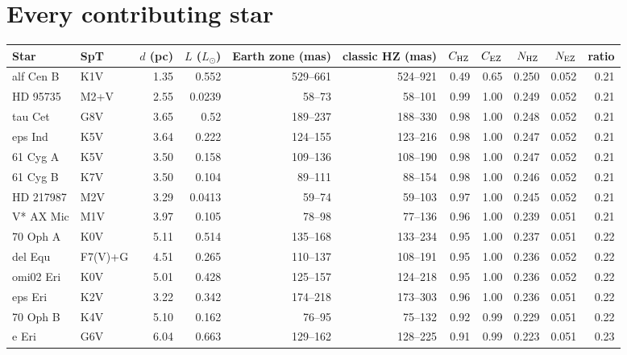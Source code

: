 \documentclass[11pt,a4paper]{article}
\begin{document}
\section{Every contributing star}
\label{app:stars}

{\scriptsize
\setlength{\tabcolsep}{3pt}
\begin{longtable}{llrrrrrrrrr}
\toprule
\textbf{Star} & \textbf{SpT} & \textbf{$d$ (pc)} & \textbf{$L$ ($L_\odot$)} & \textbf{Earth zone (mas)} & \textbf{classic HZ (mas)} & \textbf{$C_{\rm HZ}$} & \textbf{$C_{\rm EZ}$} & \textbf{$N_{\rm HZ}$} & \textbf{$N_{\rm EZ}$} & \textbf{ratio} \\
\midrule
\endhead
alf Cen B & K1V & 1.35 & 0.552 & 529--661 & 524--921 & 0.49 & 0.65 & 0.250 & 0.052 & 0.21 \\
HD  95735 & M2+V & 2.55 & 0.0239 & 58--73 & 58--101 & 0.99 & 1.00 & 0.249 & 0.052 & 0.21 \\
tau Cet & G8V & 3.65 & 0.52 & 189--237 & 188--330 & 0.98 & 1.00 & 0.248 & 0.052 & 0.21 \\
eps Ind & K5V & 3.64 & 0.222 & 124--155 & 123--216 & 0.98 & 1.00 & 0.247 & 0.052 & 0.21 \\
61 Cyg A & K5V & 3.50 & 0.158 & 109--136 & 108--190 & 0.98 & 1.00 & 0.247 & 0.052 & 0.21 \\
61 Cyg B & K7V & 3.50 & 0.104 & 89--111 & 88--154 & 0.98 & 1.00 & 0.246 & 0.052 & 0.21 \\
HD 217987 & M2V & 3.29 & 0.0413 & 59--74 & 59--103 & 0.97 & 1.00 & 0.245 & 0.052 & 0.21 \\
V* AX Mic & M1V & 3.97 & 0.105 & 78--98 & 77--136 & 0.96 & 1.00 & 0.239 & 0.051 & 0.21 \\
70 Oph A & K0V & 5.11 & 0.514 & 135--168 & 133--234 & 0.95 & 1.00 & 0.237 & 0.051 & 0.22 \\
del Equ & F7(V)+G & 4.51 & 0.265 & 110--137 & 108--191 & 0.95 & 1.00 & 0.236 & 0.052 & 0.22 \\
omi02 Eri & K0V & 5.01 & 0.428 & 125--157 & 124--218 & 0.95 & 1.00 & 0.236 & 0.052 & 0.22 \\
eps Eri & K2V & 3.22 & 0.342 & 174--218 & 173--303 & 0.96 & 1.00 & 0.236 & 0.051 & 0.22 \\
70 Oph B & K4V & 5.10 & 0.162 & 76--95 & 75--132 & 0.92 & 0.99 & 0.229 & 0.051 & 0.22 \\
e Eri & G6V & 6.04 & 0.663 & 129--162 & 128--225 & 0.91 & 0.99 & 0.223 & 0.051 & 0.23 \\

\end{longtable}}
\end{document}

